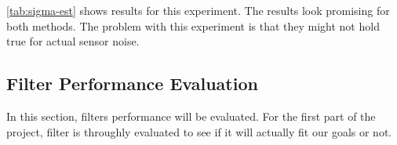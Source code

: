 \documentclass[10pt,twocolumn,letterpaper]{article}
\begin{document}
\autoref{tab:sigma-est} shows results for this experiment. The results look promising for both methods. The problem with this experiment is that they might not hold true for actual sensor noise.


\subsection{Filter Performance Evaluation}
In this section, filters performance will be evaluated. For the first part of the project, filter is throughly evaluated to see if it will actually fit our goals or not.
{\small


}
\end{document}

